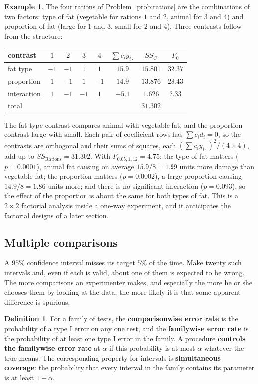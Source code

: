 \documentclass[11pt,a4paper]{article}
\numberwithin{equation}{section}
\theoremstyle{definition}
\newtheorem{defn}[thm]{Definition}
\newtheorem{exa}[thm]{Example}
\begin{document}
\begin{exa}\label{exa:rations-contrasts}
The four rations of Problem~\ref{prob:rations} are the combinations of two factors: type of fat (vegetable for rations $1$
and $2$, animal for $3$ and $4$) and proportion of fat (large for $1$ and $3$, small for $2$ and $4$). Three contrasts follow from the structure:
\begin{center}
\begin{tabular}{l|cccc|c|c|c}
contrast & $1$ & $2$ & $3$ & $4$ & $\sum c_iy_{i\cdot}$ & $SS_C$ & $F_0$ \\
\hline
fat type & $-1$ & $-1$ & $1$ & $1$ & $15.9$ & $15.801$ & $32.37$ \\
proportion & $1$ & $-1$ & $1$ & $-1$ & $14.9$ & $13.876$ & $28.43$ \\
interaction & $1$ & $-1$ & $-1$ & $1$ & $-5.1$ & $1.626$ & $3.33$ \\
\hline
total & & & & & & $31.302$ &
\end{tabular}
\end{center}
The fat-type contrast compares animal with vegetable fat, and the proportion contrast large with small. Each pair of coefficient rows has $\sum c_id_i = 0$, so the contrasts are orthogonal and their sums of squares, each $(\sum c_iy_{i\cdot})^2/(4 \times 4)$, add up to
$SS_{\mathrm{Rations}} = 31.302$. With $F_{0.05,1,12} = 4.75$: the type of fat matters ($p = 0.0001$), animal fat causing on average $15.9/8 = 1.99$ units more damage
than vegetable fat; the proportion matters ($p = 0.0002$), a large proportion causing $14.9/8 = 1.86$ units more; and there is no significant
interaction ($p = 0.093$), so the effect of the proportion is about the same for both types of fat. This is a $2 \times 2$ factorial analysis inside a
one-way experiment, and it anticipates the factorial designs of a later section.
\end{exa}

\subsection{Multiple comparisons}
A $95\%$ confidence interval misses its target $5\%$ of the time. Make twenty such intervals and, even if each is valid, about one of them is
expected to be wrong. The more comparisons an experimenter makes, and especially the more he or she chooses them by looking at the data,
the more likely it is that some apparent difference is spurious.

\begin{defn}
For a family of tests, the \textbf{comparisonwise error rate} is the probability of a type I error on any one test, and the \textbf{familywise error rate}
is the probability of at least one type I error in the family. A procedure \textbf{controls the familywise error rate} at $\alpha$ if this probability is at
most $\alpha$ whatever the true means. The corresponding property for intervals is \textbf{simultaneous coverage}: the probability that every interval in the
family contains its parameter is at least $1 - \alpha$.
\end{defn}
\end{document}

